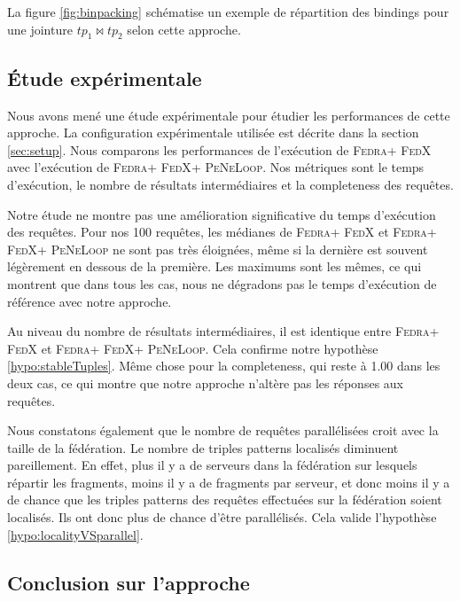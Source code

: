 \documentclass[a4paper]{article}
\def\fedra{\textsc{Fedra}\xspace}
\def\fedx{\textsc{FedX}\xspace}
\def\peneloop{\textsc{PeNeLoop}\xspace}
\begin{document}
La figure \ref{fig:binpacking} schématise un exemple de répartition des bindings pour une jointure $tp_1 \bowtie tp_2$ selon cette approche.





\subsection{Étude expérimentale}\label{sec:expPBJ}

Nous avons mené une étude expérimentale pour étudier les performances de cette approche. La configuration expérimentale utilisée est décrite dans la section \ref{sec:setup}. Nous comparons les performances de l'exécution de \fedra + \fedx avec l'exécution de \fedra + \fedx + \peneloop. Nos métriques sont le temps d'exécution, le nombre de résultats intermédiaires et la completeness des requêtes.

Notre étude ne montre pas une amélioration significative du temps d'exécution des requêtes. Pour nos 100 requêtes, les médianes de \fedra + \fedx et \fedra + \fedx + \peneloop ne sont pas très éloignées, même si la dernière est souvent légèrement en dessous de la première. Les maximums sont les mêmes, ce qui montrent que dans tous les cas, nous ne dégradons pas le temps d'exécution de référence avec notre approche.

Au niveau du nombre de résultats intermédiaires, il est identique entre \fedra + \fedx et \fedra + \fedx + \peneloop. Cela confirme notre hypothèse \ref{hypo:stableTuples}. Même chose pour la completeness, qui reste à 1.00 dans les deux cas, ce qui montre que notre approche n'altère pas les réponses aux requêtes.

Nous constatons également que le nombre de requêtes parallélisées croit avec la taille de la fédération. Le nombre de triples patterns localisés diminuent pareillement. En effet, plus il y a de serveurs dans la fédération sur lesquels répartir les fragments, moins il y a de fragments par serveur, et donc moins il y a de chance que les triples patterns des requêtes effectuées sur la fédération soient localisés. Ils ont donc plus de chance d'être parallélisés. Cela valide l'hypothèse \ref{hypo:localityVSparallel}.

\subsection{Conclusion sur l'approche}
\end{document}
